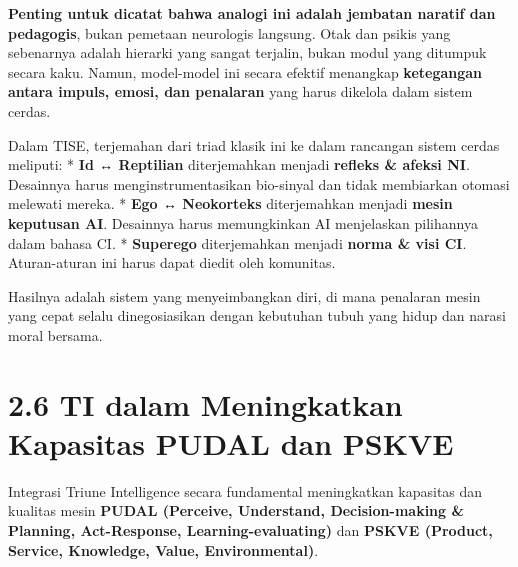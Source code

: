 \documentclass[
  letterpaper,
  DIV=11,
  numbers=noendperiod]{scrreprt}
\begin{document}
\textbf{Penting untuk dicatat bahwa analogi ini adalah jembatan naratif
dan pedagogis}, bukan pemetaan neurologis langsung. Otak dan psikis yang
sebenarnya adalah hierarki yang sangat terjalin, bukan modul yang
ditumpuk secara kaku. Namun, model-model ini secara efektif menangkap
\textbf{ketegangan antara impuls, emosi, dan penalaran} yang harus
dikelola dalam sistem cerdas.

Dalam TISE, terjemahan dari triad klasik ini ke dalam rancangan sistem
cerdas meliputi: * \textbf{Id ↔ Reptilian} diterjemahkan menjadi
\textbf{refleks \& afeksi NI}. Desainnya harus menginstrumentasikan
bio-sinyal dan tidak membiarkan otomasi melewati mereka. * \textbf{Ego ↔
Neokorteks} diterjemahkan menjadi \textbf{mesin keputusan AI}. Desainnya
harus memungkinkan AI menjelaskan pilihannya dalam bahasa CI. *
\textbf{Superego} diterjemahkan menjadi \textbf{norma \& visi CI}.
Aturan-aturan ini harus dapat diedit oleh komunitas.

Hasilnya adalah sistem yang menyeimbangkan diri, di mana penalaran mesin
yang cepat selalu dinegosiasikan dengan kebutuhan tubuh yang hidup dan
narasi moral bersama.

\section{\texorpdfstring{\textbf{2.6 TI dalam Meningkatkan Kapasitas
PUDAL dan
PSKVE}}{2.6 TI dalam Meningkatkan Kapasitas PUDAL dan PSKVE}}\label{ti-dalam-meningkatkan-kapasitas-pudal-dan-pskve}

Integrasi Triune Intelligence secara fundamental meningkatkan kapasitas
dan kualitas mesin \textbf{PUDAL (Perceive, Understand, Decision-making
\& Planning, Act-Response, Learning-evaluating)} dan \textbf{PSKVE
(Product, Service, Knowledge, Value, Environmental)}.
\end{document}
